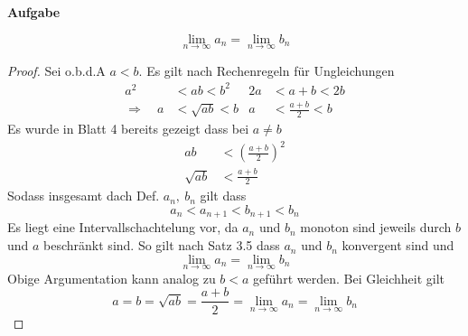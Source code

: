 \documentclass[a4paper, 12pt]{scrartcl}
\newcounter{taski}
\newcommand{\task}{\stepcounter{taski}\textbf{Aufgabe \arabic{taski}}\\}
\begin{document}
\newpage
\task
\begin{theorem}
	\[ \lim_{n \rightarrow \infty} a_n = \lim_{n \rightarrow \infty} b_n \]
\end{theorem}
\begin{proof}
Sei o.b.d.A $a < b$. Es gilt nach Rechenregeln für Ungleichungen
\begin{align*}
	a^2 &< ab \tag{$a > 0$} < b^2 & 2a &< a + b < 2b \\
	\Rightarrow \quad a &< \sqrt{ab} < b & a &< \frac{a+b}2 < b
\end{align*}
Es wurde in Blatt 4 bereits gezeigt dass bei $a \neq b$
\begin{align*}
	ab &< \left( \frac{a+b}2 \right)^2 \\
	\sqrt{ab} &< \frac{a+b}2
\end{align*}
Sodass insgesamt dach Def. $a_n,\ b_n$ gilt dass
\[ a_n < a_{n+1} < b_{n+1} < b_n \]
Es liegt eine Intervallschachtelung vor, da $a_n$ und $b_n$ monoton sind jeweils durch $b$ und $a$ beschränkt sind. So gilt nach Satz 3.5 dass $a_n$ und $b_n$ konvergent sind und
\[ \lim_{n \rightarrow \infty} a_n = \lim_{n \rightarrow \infty} b_n \]
Obige Argumentation kann analog zu $b < a$ geführt werden. Bei Gleichheit gilt
\[ a = b = \sqrt{ab} = \frac{a+b}2 = \lim_{n \rightarrow \infty} a_n = \lim_{n \rightarrow \infty} b_n  \]
\end{proof}
\end{document}
